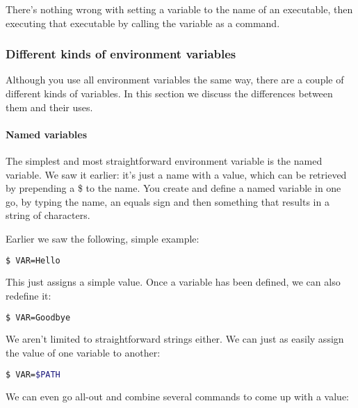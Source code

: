 There's nothing wrong with setting a variable to the name of an executable,
then executing that executable by calling the variable as a command.

\subsubsection{Different kinds of environment variables}
Although you use all environment variables the same way, there are a couple of
different kinds of variables. In this section we discuss the differences
between them and their uses.

\paragraph{Named variables}
The simplest and most straightforward environment variable is the named
variable. We saw it earlier: it's just a name with a value, which can be
retrieved by prepending a \$ to the name. You create and define a named
variable in one go, by typing the name, an equals sign and then something that
results in a string of characters.

Earlier we saw the following, simple example:
\lstset{basicstyle=\scriptsize, numbers=left, captionpos=b, tabsize=4}
\begin{lstlisting}[caption=Assigning a simple value to a variable,language={bash},
xleftmargin=15pt,label=lst:Assigningasimplevaluetoavariable1]
$ VAR=Hello
\end{lstlisting}

This just assigns a simple value. Once a variable has been defined, we can also
redefine it:
\lstset{basicstyle=\scriptsize, numbers=left, captionpos=b, tabsize=4}
\begin{lstlisting}[caption=Assigning a simple value to a variable,language={bash},
xleftmargin=15pt,label=lst:Assigningasimplevaluetoavariable2]
$ VAR=Goodbye
\end{lstlisting}


We aren't limited to straightforward strings either. We can just as easily
assign the value of one variable to another:

\lstset{basicstyle=\scriptsize, numbers=left, captionpos=b, tabsize=4}
\begin{lstlisting}[caption=Assigning a simple value to a variable,language={bash},
xleftmargin=15pt,label=lst:Assigningasimplevaluetoavariable3]
$ VAR=$PATH
\end{lstlisting}


We can even go all-out and combine several commands to come up with a value:

